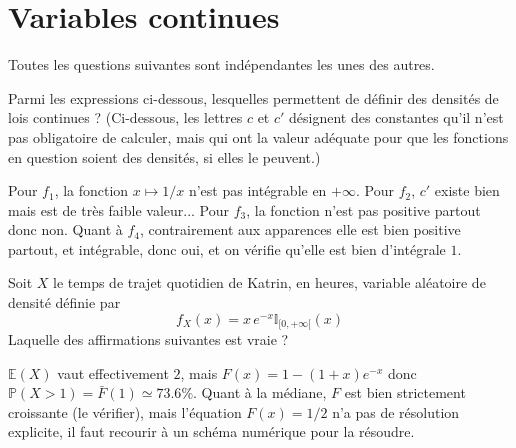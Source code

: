 \section{Variables continues}

Toutes les questions suivantes sont indépendantes les unes des autres. 

\begin{question}
Parmi les expressions ci-dessous, lesquelles permettent de définir des densités de lois continues ? (Ci-dessous, les lettres $c$ et $c'$ désignent des constantes qu'il n'est pas obligatoire de calculer, mais qui ont la valeur adéquate pour que les fonctions en question soient des densités, si elles le peuvent.)
\begin{answers}
\bad{$f_1(x) = \displaystyle\frac {c} x \, \mathbb{I}_{[1,+\infty[}(x)$}  
\end{answers}
\begin{explanations} 
Pour $f_1$, la fonction $x\mapsto 1/x$ n'est pas intégrable en $+\infty$. Pour $f_2$, $c'$ existe bien mais est de très faible valeur... Pour $f_3$, la fonction n'est pas positive partout donc non. Quant à $f_4$, contrairement aux apparences elle est bien positive partout, et intégrable, donc oui, et on vérifie qu'elle est bien d'intégrale $1$. 
\end{explanations}
\end{question}


\begin{question}
Soit $X$ le temps de trajet quotidien de Katrin, en heures, variable aléatoire de densité définie par 
$$ f_X(x) = x\, e^{-x} \mathbb{I}_{[0,+\infty[}(x) $$
Laquelle des affirmations suivantes est vraie ?
\begin{answers}
\end{answers}
\begin{explanations}
$\mathbb{E}(X)$ vaut effectivement $2$, mais $F(x)=1-(1+x)e^{-x}$ donc $\mathbb{P}(X>1)=\bar F(1) \simeq 73.6\%$. Quant à la médiane, $F$ est bien strictement croissante (le vérifier), mais l'équation $F(x)=1/2$ n'a pas de résolution explicite, il faut recourir à un schéma numérique pour la résoudre. 
\end{explanations}
\end{question}


